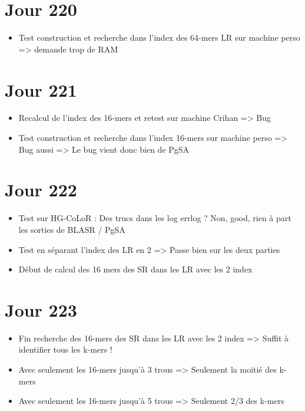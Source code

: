 \documentclass[12pt]{report}
\begin{document}
\section{Jour 220}

\begin{itemize}
	\item Test construction et recherche dans l'index des 64-mers LR sur machine perso
			=> demande trop de RAM
\end{itemize}

\section{Jour 221}

\begin{itemize}
	\item Recalcul de l'index des 16-mers et retest sur machine Crihan => Bug
	
	\item Test construction et recherche dans l'index 16-mers sur machine perso => Bug aussi
			=> Le bug vient donc bien de PgSA
\end{itemize}

\section{Jour 222}

\begin{itemize}
	\item Test sur HG-CoLoR : Des trucs dans les log errlog ? Non, good, rien à part les sorties de BLASR / PgSA
	
	\item Test en séparant l'index des LR en 2 => Passe bien sur les deux parties
	
	\item Début de calcul des 16 mers des SR dans les LR avec les 2 index
\end{itemize}

\section{Jour 223}

\begin{itemize}
	\item Fin recherche des 16-mers des SR dans les LR avec les 2 index => Suffit à identifier tous les k-mers !
	
	\item Avec seulement les 16-mers jusqu'à 3 trous => Seulement la moitié des k-mers
	
	\item Avec seulement les 16-mers jusqu'à 5 trous => Seulement 2/3 des k-mers
\end{itemize}
\end{document}

